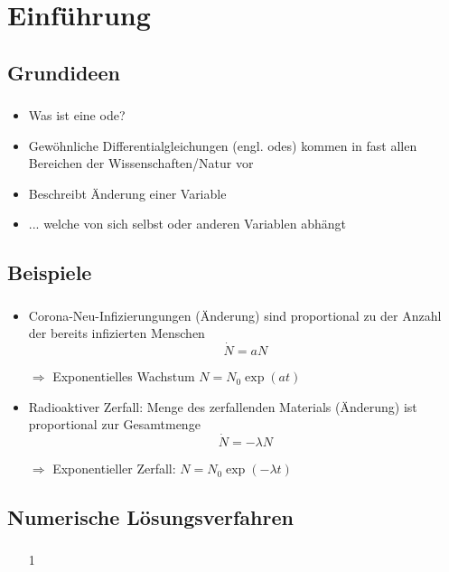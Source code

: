 \section{Einführung}
\label{sec:Introduction}


\subsection{Grundideen}
\label{subsec:basic-concepts}
\begin{frame}
    \frametitle{\insertsubsection}
    \begin{itemize}[<+->]
        \item Was ist eine \ac{ode}?
        \item Gewöhnliche Differentialgleichungen (engl. \acp{ode}) kommen in fast allen Bereichen der Wissenschaften/Natur vor
        \item Beschreibt Änderung einer Variable
        \item ... welche von sich selbst oder anderen Variablen abhängt
    \end{itemize}
\end{frame}


\subsection{Beispiele}
\label{subsec:examples}
\begin{frame}
    \frametitle{\insertsubsection}
    \begin{itemize}[<+->]
        \item Corona-Neu-Infizierungungen (Änderung) sind proportional zu der Anzahl der bereits infizierten Menschen
        \[\dot{N} = a N\]
        \item[$\Rightarrow$] Exponentielles Wachstum $N=N_0\exp(at)$
        \item Radioaktiver Zerfall: Menge des zerfallenden Materials (Änderung) ist proportional zur Gesamtmenge
        \[\dot{N} = -\lambda N\]
        \item[$\Rightarrow$] Exponentieller Zerfall: $N=N_0\exp(-\lambda t)$
    \end{itemize}
\end{frame}


\subsection{Numerische Lösungsverfahren}
\label{subsec:numerical-methods}
\begin{frame}
    \frametitle{\insertsubsection}
    \begin{enumerate}[<+->]
        \item[1]
    \end{enumerate}
\end{frame}


